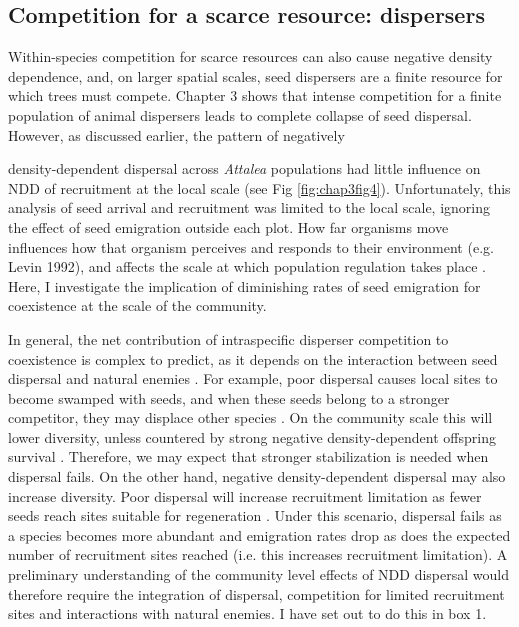 \documentclass[b5paper,justified]{tufte-book} %
\begin{document}
\begin{fullwidth}
\subsection{Competition for a scarce resource: dispersers}
Within-species competition for scarce resources can also cause negative density dependence, and, on larger spatial scales, seed dispersers are a finite resource for which trees must compete. Chapter 3 shows that intense competition for a finite population of animal dispersers leads to complete collapse of seed dispersal. However, as discussed earlier, the pattern of negatively \end{fullwidth} density-dependent dispersal across \textit{Attalea} populations had little influence on NDD of recruitment at the local scale (see Fig \ref{fig:chap3fig4}). Unfortunately, this analysis of seed arrival and recruitment was limited to the local scale, ignoring the effect of seed emigration outside each plot. How far organisms move influences how that organism perceives and responds to their environment (e.g. Levin 1992), and affects the scale at which population regulation takes place \citep{Turchin1995}. Here, I investigate the implication of diminishing rates of seed emigration for coexistence at the scale of the community. \begin{fullwidth} 

\hspace{0.4cm} In general, the net contribution of intraspecific disperser competition to coexistence is complex to predict, as it depends on the interaction between seed dispersal and natural enemies \citep{Adler2005, Muller-Landau2007}. For example, poor dispersal causes local sites to become swamped with seeds, and when these seeds belong to a stronger competitor, they may displace other species \citep{Pacala1997}.  On the community scale this will lower diversity, unless countered by strong negative density-dependent offspring survival \citep{Bagchi2010}. Therefore, we may expect that stronger stabilization is needed when dispersal fails. On the other hand, negative density-dependent dispersal may also increase diversity. Poor dispersal will increase recruitment limitation as fewer seeds reach sites suitable for regeneration \citep{Nathan2000, Dalling2002}. Under this scenario, dispersal fails as a species becomes more abundant and emigration rates drop as does the expected number of recruitment sites reached (i.e. this increases recruitment limitation). A preliminary understanding of the community level effects of NDD dispersal would therefore require the integration of dispersal, competition for limited recruitment sites and interactions with natural enemies. I have set out to do this in box 1. 


\end{fullwidth}
\end{document}
